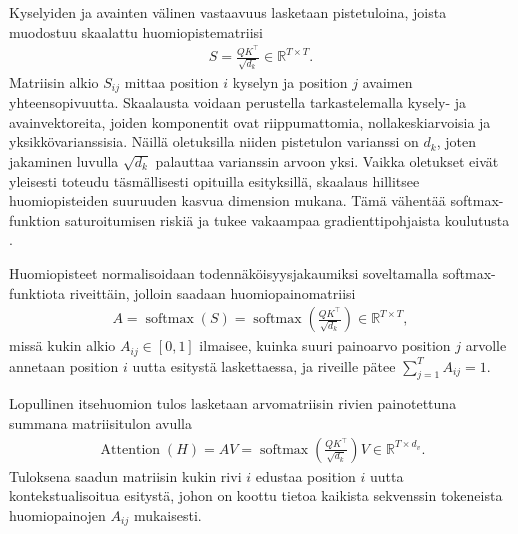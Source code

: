 Kyselyiden ja avainten välinen vastaavuus lasketaan pistetuloina, joista muodostuu skaalattu huomiopistematriisi
\begin{align*}
  S = \frac{QK^{\top}}{\sqrt{d_k}} \in \mathbb{R}^{T \times T}.
\end{align*}
Matriisin alkio \(S_{ij}\) mittaa position \(i\) kyselyn ja
position \(j\) avaimen yhteensopivuutta. Skaalausta voidaan
perustella tarkastelemalla kysely- ja avainvektoreita, joiden
komponentit ovat riippumattomia, nollakeskiarvoisia ja
yksikkövarianssisia. Näillä oletuksilla niiden pistetulon
varianssi on \(d_k\), joten jakaminen luvulla \(\sqrt{d_k}\)
palauttaa varianssin arvoon yksi. Vaikka oletukset eivät
yleisesti toteudu täsmällisesti opituilla esityksillä,
skaalaus hillitsee huomiopisteiden suuruuden kasvua dimension
mukana. Tämä vähentää softmax-funktion saturoitumisen riskiä
ja tukee vakaampaa gradienttipohjaista koulutusta
\cite{vaswani2017attention}.

Huomiopisteet normalisoidaan todennäköisyysjakaumiksi soveltamalla softmax-funktiota riveittäin, jolloin saadaan huomiopainomatriisi
\begin{align*}
  A = \operatorname{softmax}(S) = \operatorname{softmax}\left(\frac{QK^{\top}}{\sqrt{d_k}}\right) \in \mathbb{R}^{T \times T},
\end{align*}
missä kukin alkio \(A_{ij} \in [0, 1]\) ilmaisee, kuinka suuri painoarvo position \(j\) arvolle annetaan position \(i\) uutta esitystä laskettaessa, ja riveille pätee \(\sum_{j=1}^{T} A_{ij} = 1\).

Lopullinen itsehuomion tulos lasketaan arvomatriisin rivien
painotettuna summana matriisitulon avulla
\begin{align*}
  \operatorname{Attention}(H)
  =
  AV
  =
  \operatorname{softmax}
  \left(
    \frac{QK^{\top}}{\sqrt{d_k}}
  \right)V
  \in
  \mathbb{R}^{T \times d_v}.
\end{align*}
Tuloksena saadun matriisin kukin rivi \(i\) edustaa position \(i\)
uutta kontekstualisoitua esitystä, johon on koottu tietoa kaikista
sekvenssin tokeneista huomiopainojen \(A_{ij}\) mukaisesti.

